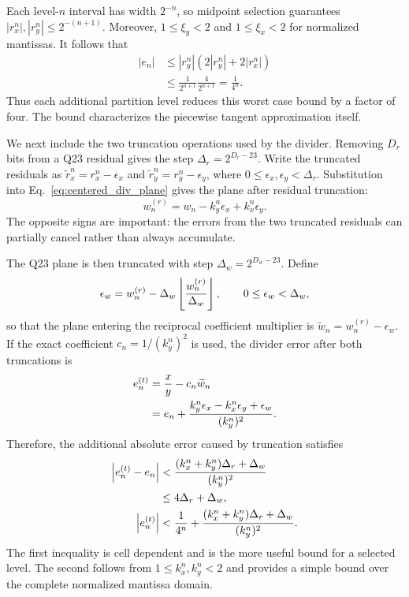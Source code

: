 \documentclass[conference]{IEEEtran}
\begin{document}
Each level-$n$ interval has width $2^{-n}$, so midpoint selection guarantees
$|r_x^n|,|r_y^n|\leq2^{-(n+1)}$. Moreover,
$1\leq\xi_y<2$ and $1\leq\xi_x<2$ for normalized mantissas. It follows that
\begin{equation}
\begin{aligned}
|e_n|
&\leq |r_y^n|\left(2|r_y^n|+2|r_x^n|\right)\\
&\leq \frac{1}{2^{n+1}}\frac{4}{2^{n+1}}
=\frac{1}{4^n}.
\end{aligned}
\label{eq:divider_error_bound}
\end{equation}
Thus each additional partition level reduces this worst case bound by a factor
of four. The bound characterizes the piecewise tangent approximation itself.

We next include the two truncation operations used by the divider. Removing
$D_r$ bits from a Q23 residual gives the step
$\Delta_r=2^{D_r-23}$. Write the truncated residuals as
$\widetilde r_x^n=r_x^n-\epsilon_x$ and
$\widetilde r_y^n=r_y^n-\epsilon_y$, where
$0\leq\epsilon_x,\epsilon_y<\Delta_r$. Substitution into
Eq.~\eqref{eq:centered_div_plane} gives the plane after residual truncation:
\begin{equation}
 w_n^{(r)}=w_n-k_y^n\epsilon_x+k_x^n\epsilon_y.
 \label{eq:divider_residual_truncation_error}
\end{equation}
The opposite signs are important: the errors from the two truncated residuals
can partially cancel rather than always accumulate.

The Q23 plane is then truncated with step
$\Delta_w=2^{D_w-23}$. Define
\begin{equation}
 \epsilon_w=w_n^{(r)}-
 \Delta_w\left\lfloor{w_n^{(r)}\over\Delta_w}\right\rfloor,
 \qquad 0\leq\epsilon_w<\Delta_w,
\end{equation}
so that the plane entering the reciprocal coefficient multiplier is
$\widetilde w_n=w_n^{(r)}-\epsilon_w$. If the exact coefficient
$c_n=1/(k_y^n)^2$ is used, the divider error after both truncations is
\begin{equation}
\begin{aligned}
 e_n^{(t)}
 &= {x\over y}-c_n\widetilde w_n\\
 &=e_n+{k_y^n\epsilon_x-k_x^n\epsilon_y+\epsilon_w
          \over(k_y^n)^2}.
\end{aligned}
\label{eq:divider_total_truncation_error}
\end{equation}
Therefore, the additional absolute error caused by truncation satisfies
\begin{equation}
\begin{aligned}
 \left|e_n^{(t)}-e_n\right|
 &<{(k_x^n+k_y^n)\Delta_r+\Delta_w\over(k_y^n)^2}\\
 &\leq 4\Delta_r+\Delta_w,\\
 \left|e_n^{(t)}\right|
 &<{1\over4^n}
   +{(k_x^n+k_y^n)\Delta_r+\Delta_w\over(k_y^n)^2}.
\end{aligned}
 \label{eq:divider_truncation_error_bound}
\end{equation}
The first inequality is cell dependent and is the more useful bound for a
selected level. The second follows from $1\leq k_x^n,k_y^n<2$ and provides a
simple bound over the complete normalized mantissa domain.
\end{document}
